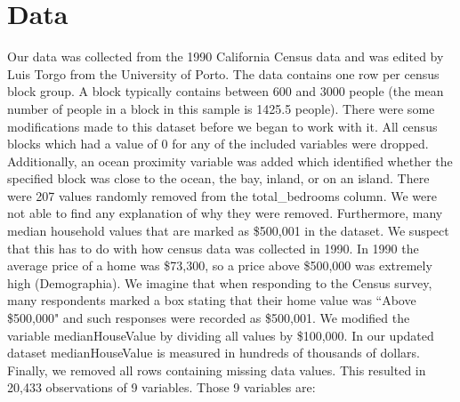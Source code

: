 \documentclass{article}
\begin{document}
\section*{Data}

Our data was collected from the 1990 California Census data and was edited by Luis Torgo from the University of Porto. The data contains one row per census block group. A block typically contains between 600 and 3000 people (the mean number of people in a block in this sample is 1425.5 people). There were some modifications made to this dataset before we began to work with it. All census blocks which had a value of 0 for any of the included variables were dropped. Additionally, an ocean proximity variable was added which identified whether the specified block was close to the ocean, the bay, inland, or on an island. There were 207 values randomly removed from the total\_bedrooms column. We were not able to find any explanation of why they were removed. Furthermore, many median household values that are marked as \$500,001 in the dataset. We suspect that this has to do with how census data was collected in 1990. In 1990 the average price of a home was \$73,300, so a price above \$500,000 was extremely high (Demographia). We imagine that when responding to the Census survey, many respondents marked a box stating that their home value was ``Above \$500,000" and such responses were recorded as \$500,001. We modified the variable medianHouseValue by dividing all values by \$100,000. In our updated dataset medianHouseValue is measured in hundreds of thousands of dollars. Finally, we removed all rows containing missing data values. This resulted in 20,433 observations of 9 variables. Those 9 variables are:
\end{document}
